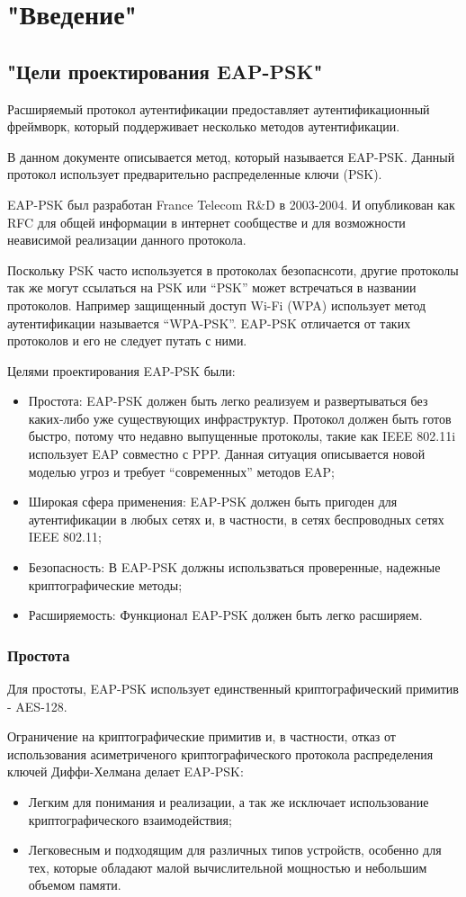 \section{"Введение"}

\subsection{"Цели проектирования EAP-PSK"}

Расширяемый протокол аутентификации предоставляет аутентификационный фреймворк, который поддерживает несколько методов аутентификации.

В данном документе описывается метод, который называется EAP-PSK. Данный протокол использует предварительно распределенные ключи (PSK).

EAP-PSK был разработан France Telecom R\&D в 2003-2004. И опубликован как RFC для общей информации в интернет сообществе и для возможности неависимой реализации данного протокола.

Поскольку PSK часто используется в протоколах безопаснсоти, другие протоколы так же могут ссылаться на PSK или ``PSK'' может встречаться в названии протоколов. Например защищенный доступ Wi-Fi (WPA) использует метод аутентификации называется ``WPA-PSK''. EAP-PSK отличается от таких протоколов и его не следует путать с ними.

Целями проектирования EAP-PSK были:
\begin{itemize}
\item Простота: EAP-PSK должен быть легко реализуем и развертываться без каких-либо уже существующих инфраструктур. Протокол должен быть готов быстро, потому что недавно выпущенные протоколы, такие как IEEE 802.11i использует EAP совместно с PPP. Данная ситуация описывается новой моделью угроз и требует ``современных'' методов EAP;
\item Широкая сфера применения: EAP-PSK должен быть пригоден для аутентификации в любых сетях и, в частности, в сетях беспроводных сетях IEEE 802.11;
\item Безопасность: В EAP-PSK должны использваться проверенные, надежные криптографические методы;
\item Расширяемость: Функционал EAP-PSK должен быть легко расширяем.
\end{itemize}

\subsubsection{Простота}
Для простоты, EAP-PSK использует единственный криптографический примитив - AES-128.

Ограничение на криптографические примитив и, в частности, отказ от использования асиметриченого криптографического протокола распределения ключей Диффи-Хелмана делает EAP-PSK:
\begin{itemize}
\item Легким для понимания и реализации, а так же исключает использование криптографического взаимодействия;
\item Легковесным и подходящим для различных типов устройств, особенно для тех, которые обладают малой вычислительной мощностью и небольшим объемом памяти.
\end{itemize}
